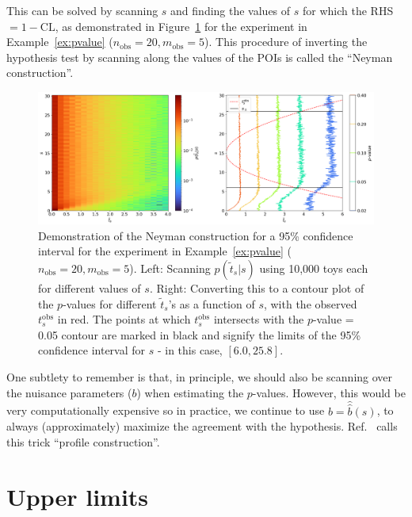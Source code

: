 This can be solved by scanning $s$ and finding the values of $s$ for which the RHS $= 1 - \mathrm{CL}$, as demonstrated in Figure~\ref{fig:neymanconstruction} for the experiment in Example~\ref{ex:pvalue} ($n_{\mathrm{obs}} = 20, m_{\mathrm{obs}} = 5$).
This procedure of inverting the hypothesis test by scanning along the values of the POIs is called the ``Neyman construction''.

\begin{figure}[htb]
\centering
\includegraphics[width=\textwidth]{figures/03-intervals-and-limits/1.png}
\caption[Demonstration of the Neyman construction for a 95\% confidence interval for the experiment in Example~\ref{ex:pvalue} ($n_{\mathrm{obs}} = 20, m_{\mathrm{obs}} = 5$).]{Demonstration of the Neyman construction for a 95\% confidence interval for the experiment in Example~\ref{ex:pvalue} ($n_{\mathrm{obs}} = 20, m_{\mathrm{obs}} = 5$).
Left: Scanning $p(\tilde{t}_s|s)$ using 10,000 toys each for different values of $s$.
Right: Converting this to a contour plot of the $p$-values for different $\tilde{t}_s$'s as a function of $s$, with the observed $t^{\mathrm{obs}}_s$ in red.
The points at which $t^{\mathrm{obs}}_s$ intersects with the $p$-value = 0.05 contour are marked in black and signify the limits of the 95\% confidence interval for $s$ - in this case, $[6.0, 25.8]$.}
\label{fig:neymanconstruction}
\end{figure}

One subtlety to remember is that, in principle, we should also be scanning over the nuisance parameters ($b$) when estimating the $p$-values. However, this would be very computationally expensive so in practice, we continue to use $b = \hat{\hat{b}}(s)$, to always (approximately) maximize the agreement with the hypothesis. Ref.~\cite{Cranmer:2014lly} calls this trick ``profile construction''.

\section{Upper limits}
\label{sec:upper_limits}

